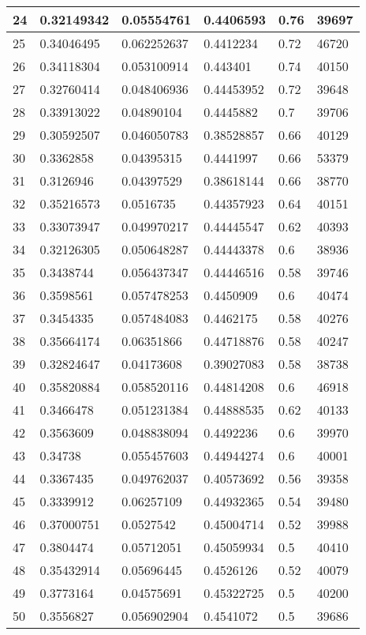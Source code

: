 \begin{longtable}{|l|l|l|l|l|l|}
24 & 0.32149342 & 0.05554761 & 0.4406593 & 0.76 & 39697 \\ \hline 
25 & 0.34046495 & 0.062252637 & 0.4412234 & 0.72 & 46720 \\ \hline 
26 & 0.34118304 & 0.053100914 & 0.443401 & 0.74 & 40150 \\ \hline 
27 & 0.32760414 & 0.048406936 & 0.44453952 & 0.72 & 39648 \\ \hline 
28 & 0.33913022 & 0.04890104 & 0.4445882 & 0.7 & 39706 \\ \hline 
29 & 0.30592507 & 0.046050783 & 0.38528857 & 0.66 & 40129 \\ \hline 
30 & 0.3362858 & 0.04395315 & 0.4441997 & 0.66 & 53379 \\ \hline 
31 & 0.3126946 & 0.04397529 & 0.38618144 & 0.66 & 38770 \\ \hline 
32 & 0.35216573 & 0.0516735 & 0.44357923 & 0.64 & 40151 \\ \hline 
33 & 0.33073947 & 0.049970217 & 0.44445547 & 0.62 & 40393 \\ \hline 
34 & 0.32126305 & 0.050648287 & 0.44443378 & 0.6 & 38936 \\ \hline 
35 & 0.3438744 & 0.056437347 & 0.44446516 & 0.58 & 39746 \\ \hline 
36 & 0.3598561 & 0.057478253 & 0.4450909 & 0.6 & 40474 \\ \hline 
37 & 0.3454335 & 0.057484083 & 0.4462175 & 0.58 & 40276 \\ \hline 
38 & 0.35664174 & 0.06351866 & 0.44718876 & 0.58 & 40247 \\ \hline 
39 & 0.32824647 & 0.04173608 & 0.39027083 & 0.58 & 38738 \\ \hline 
40 & 0.35820884 & 0.058520116 & 0.44814208 & 0.6 & 46918 \\ \hline 
41 & 0.3466478 & 0.051231384 & 0.44888535 & 0.62 & 40133 \\ \hline 
42 & 0.3563609 & 0.048838094 & 0.4492236 & 0.6 & 39970 \\ \hline 
43 & 0.34738 & 0.055457603 & 0.44944274 & 0.6 & 40001 \\ \hline 
44 & 0.3367435 & 0.049762037 & 0.40573692 & 0.56 & 39358 \\ \hline 
45 & 0.3339912 & 0.06257109 & 0.44932365 & 0.54 & 39480 \\ \hline 
46 & 0.37000751 & 0.0527542 & 0.45004714 & 0.52 & 39988 \\ \hline 
47 & 0.3804474 & 0.05712051 & 0.45059934 & 0.5 & 40410 \\ \hline 
48 & 0.35432914 & 0.05696445 & 0.4526126 & 0.52 & 40079 \\ \hline 
49 & 0.3773164 & 0.04575691 & 0.45322725 & 0.5 & 40200 \\ \hline 
50 & 0.3556827 & 0.056902904 & 0.4541072 & 0.5 & 39686 \\ \hline 
\end{longtable}